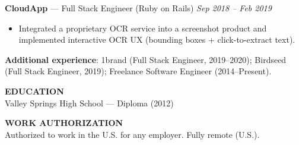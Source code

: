 \documentclass[10pt]{article}
\begin{document}
\textbf{CloudApp} --- Full Stack Engineer (Ruby on Rails) \hfill \textit{Sep 2018 -- Feb 2019}\\
\vspace{-6pt}
\begin{itemize}
  \setlength\itemsep{-2pt}
  \setlength\parskip{0pt}
  \setlength\parsep{0pt}
  \item Integrated a proprietary OCR service into a screenshot product and implemented interactive OCR UX (bounding boxes + click-to-extract text).
\end{itemize}

\textbf{Additional experience}: 1brand (Full Stack Engineer, 2019--2020); Birdseed (Full Stack Engineer, 2019); Freelance Software Engineer (2014--Present).

\vspace{6pt}
\textbf{EDUCATION}\\
Valley Springs High School --- Diploma (2012)

\vspace{2pt}
\textbf{WORK AUTHORIZATION}\\
Authorized to work in the U.S. for any employer. Fully remote (U.S.).
\end{document}
